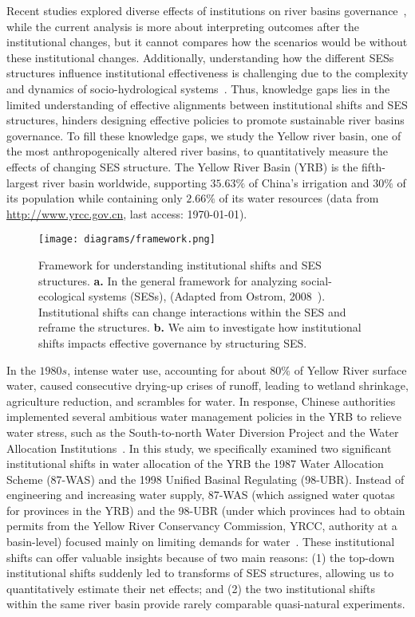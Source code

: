 Recent studies explored diverse effects of institutions on river basins governance~\cite{bouckaert2022, vallury2022, loch2020, kirchhoff2016}, while the current analysis is more about interpreting outcomes after the institutional changes, but it cannot compares how the scenarios would be without these institutional changes.
Additionally, understanding how the different SESs structures influence institutional effectiveness is challenging due to the complexity and dynamics of socio-hydrological systems~\cite{bodin2017b}.
Thus, knowledge gaps lies in the limited understanding of effective alignments between institutional shifts and SES structures, hinders designing effective policies to promote sustainable river basins governance.
To fill these knowledge gaps, we study the Yellow river basin, one of the most anthropogenically altered river basins, to quantitatively measure the effects of changing SES structure.
The Yellow River Basin (YRB) is the fifth-largest river basin worldwide, supporting $35.63\%$ of China's irrigation and $30\%$ of its population while containing only $2.66\%$ of its water resources (data from \href{http://www.yrcc.gov.cn}{http://www.yrcc.gov.cn}, last access: \today).

\begin{figure}[!ht]
	\centering
	\texttt{[image: diagrams/framework.png]}
	\caption{
		Framework for understanding institutional shifts and SES structures. \textbf{a.} In the general framework for analyzing social-ecological systems (SESs), (Adapted from Ostrom, 2008~\cite{ostrom2009}). Institutional shifts can change interactions within the SES and reframe the structures.  \textbf{b.} We aim to investigate how institutional shifts impacts effective governance by structuring SES.}\label{fig:framework}
\end{figure}

In the $1980s$, intense water use, accounting for about $80\%$ of Yellow River surface water, caused consecutive drying-up crises of runoff, leading to wetland shrinkage, agriculture reduction, and scrambles for water.
In response, Chinese authorities implemented several ambitious water management policies in the YRB to relieve water stress, such as the South-to-north Water Diversion Project and the Water Allocation Institutions~\cite{long2020, wang2019d}.
In this study, we specifically examined two significant institutional shifts in water allocation of the YRB\: the 1987 Water Allocation Scheme (87-WAS) and the 1998 Unified Basinal Regulating (98-UBR).
Instead of engineering and increasing water supply, 87-WAS (which assigned water quotas for provinces in the YRB) and the 98-UBR (under which provinces had to obtain permits from the Yellow River Conservancy Commission, YRCC, authority at a basin-level) focused mainly on limiting demands for water~\cite{bouckaert2022, speed2013}.
These institutional shifts can offer valuable insights because of two main reasons:
(1) the top-down institutional shifts suddenly led to transforms of SES structures, allowing us to quantitatively estimate their net effects; and (2) the two institutional shifts within the same river basin provide rarely comparable quasi-natural experiments.

